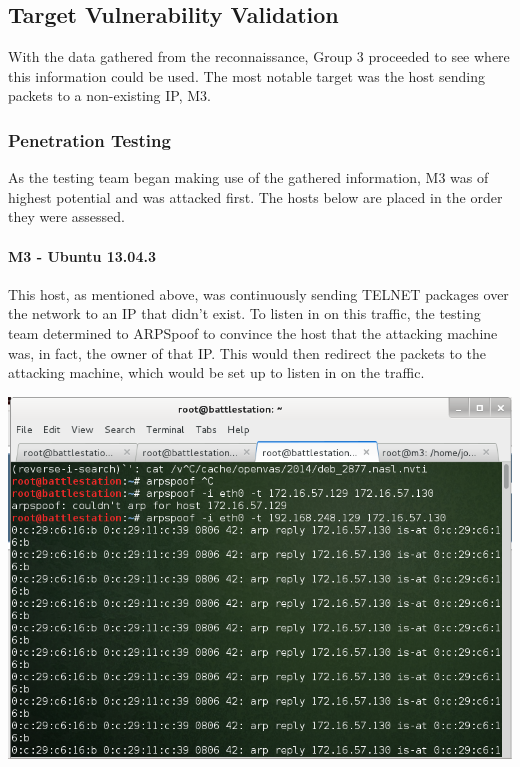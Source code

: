 \subsection{Target Vulnerability Validation}
With the data gathered from the reconnaissance, Group 3 proceeded to see where this information could be used. The most notable target was the host sending packets to a non-existing IP, M3.
  
\subsubsection{Penetration Testing}
As the testing team began making use of the gathered information, M3 was of highest potential and was attacked first. The hosts below are placed in the order they were assessed.

\paragraph{M3 - Ubuntu 13.04.3}
This host, as mentioned above, was continuously sending TELNET packages over the network to an IP that didn't exist. To listen in on this traffic, the testing team determined to ARPSpoof to convince the host that the attacking machine was, in fact, the owner of that IP. This would then redirect the packets to the attacking machine, which would be set up to listen in on the traffic.

\includegraphics[scale=0.5]{arpspoof2.png}

